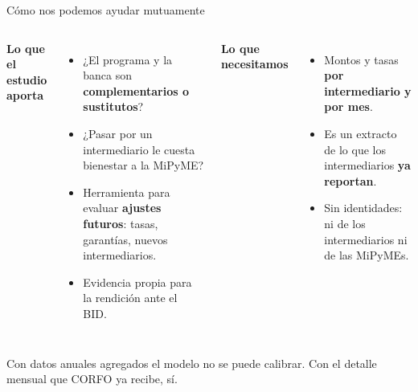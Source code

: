 \documentclass[aspectratio=169]{beamer}
\begin{document}
\begin{frame}{Cómo nos podemos ayudar mutuamente}
\begin{columns}[T]
    \textbf{Lo que el estudio aporta}
    \begin{itemize}
        \item ¿El programa y la banca son \textbf{complementarios o sustitutos}?
        \item ¿Pasar por un intermediario le cuesta bienestar a la MiPyME?
        \item Herramienta para evaluar \textbf{ajustes futuros}: tasas, garantías, nuevos intermediarios.
        \item Evidencia propia para la rendición ante el BID.
    \end{itemize}

    \textbf{Lo que necesitamos}
    \begin{itemize}
        \item Montos y tasas \textbf{por intermediario y por mes}.
        \item Es un extracto de lo que los intermediarios \textbf{ya reportan}.
        \item Sin identidades: ni de los intermediarios ni de las MiPyMEs.
    \end{itemize}
\end{columns}

\vfill
\begin{block}{}
\centering Con datos anuales agregados el modelo no se puede calibrar. Con el detalle mensual que CORFO ya recibe, sí.
\end{block}
\end{frame}
\end{document}
